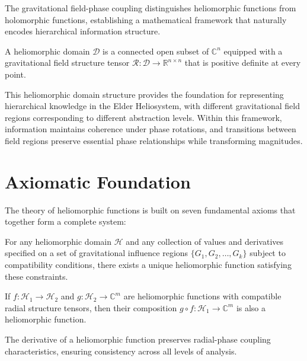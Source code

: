 The gravitational field-phase coupling distinguishes heliomorphic functions from holomorphic functions, establishing a mathematical framework that naturally encodes hierarchical information structure.

\begin{definition}
A heliomorphic domain $\mathcal{D}$ is a connected open subset of $\mathbb{C}^n$ equipped with a gravitational field structure tensor $\mathcal{R}: \mathcal{D} \rightarrow \mathbb{R}^{n \times n}$ that is positive definite at every point.
\end{definition}

This heliomorphic domain structure provides the foundation for representing hierarchical knowledge in the Elder Heliosystem, with different gravitational field regions corresponding to different abstraction levels. Within this framework, information maintains coherence under phase rotations, and transitions between field regions preserve essential phase relationships while transforming magnitudes.

\section{Axiomatic Foundation}

The theory of heliomorphic functions is built on seven fundamental axioms that together form a complete system:

\begin{axiom}
For any heliomorphic domain $\mathcal{H}$ and any collection of values and derivatives specified on a set of gravitational influence regions $\{G_1, G_2, \ldots, G_k\}$ subject to compatibility conditions, there exists a unique heliomorphic function satisfying these constraints.
\end{axiom}

\begin{axiom}
If $f: \mathcal{H}_1 \rightarrow \mathcal{H}_2$ and $g: \mathcal{H}_2 \rightarrow \mathbb{C}^m$ are heliomorphic functions with compatible radial structure tensors, then their composition $g \circ f: \mathcal{H}_1 \rightarrow \mathbb{C}^m$ is also a heliomorphic function.
\end{axiom}

\begin{axiom}
The derivative of a heliomorphic function preserves radial-phase coupling characteristics, ensuring consistency across all levels of analysis.
\end{axiom}

